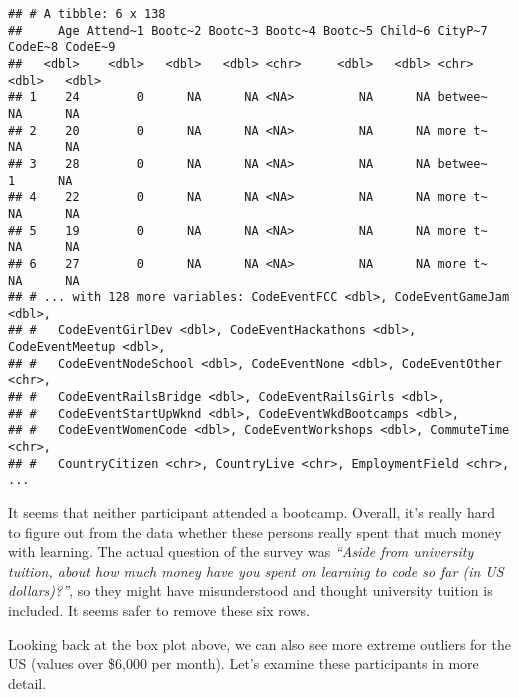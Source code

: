 \documentclass[
]{article}
\newenvironment{Shaded}{\begin{snugshade}}{\end{snugshade}}
\newcommand{\CommentTok}[1]{\textcolor[rgb]{0.56,0.35,0.01}{\textit{#1}}}
\newcommand{\FunctionTok}[1]{\textcolor[rgb]{0.00,0.00,0.00}{#1}}
\newcommand{\NormalTok}[1]{#1}
\newcommand{\OtherTok}[1]{\textcolor[rgb]{0.56,0.35,0.01}{#1}}
\newcommand{\SpecialCharTok}[1]{\textcolor[rgb]{0.00,0.00,0.00}{#1}}
\begin{document}
\begin{verbatim}
## # A tibble: 6 x 138
##     Age Attend~1 Bootc~2 Bootc~3 Bootc~4 Bootc~5 Child~6 CityP~7 CodeE~8 CodeE~9
##   <dbl>    <dbl>   <dbl>   <dbl> <chr>     <dbl>   <dbl> <chr>     <dbl>   <dbl>
## 1    24        0      NA      NA <NA>         NA      NA betwee~      NA      NA
## 2    20        0      NA      NA <NA>         NA      NA more t~      NA      NA
## 3    28        0      NA      NA <NA>         NA      NA betwee~       1      NA
## 4    22        0      NA      NA <NA>         NA      NA more t~      NA      NA
## 5    19        0      NA      NA <NA>         NA      NA more t~      NA      NA
## 6    27        0      NA      NA <NA>         NA      NA more t~      NA      NA
## # ... with 128 more variables: CodeEventFCC <dbl>, CodeEventGameJam <dbl>,
## #   CodeEventGirlDev <dbl>, CodeEventHackathons <dbl>, CodeEventMeetup <dbl>,
## #   CodeEventNodeSchool <dbl>, CodeEventNone <dbl>, CodeEventOther <chr>,
## #   CodeEventRailsBridge <dbl>, CodeEventRailsGirls <dbl>,
## #   CodeEventStartUpWknd <dbl>, CodeEventWkdBootcamps <dbl>,
## #   CodeEventWomenCode <dbl>, CodeEventWorkshops <dbl>, CommuteTime <chr>,
## #   CountryCitizen <chr>, CountryLive <chr>, EmploymentField <chr>, ...
\end{verbatim}

It seems that neither participant attended a bootcamp. Overall, it's
really hard to figure out from the data whether these persons really
spent that much money with learning. The actual question of the survey
was \emph{``Aside from university tuition, about how much money have you
spent on learning to code so far (in US dollars)?''}, so they might have
misunderstood and thought university tuition is included. It seems safer
to remove these six rows.

\begin{Shaded}
\end{Shaded}

Looking back at the box plot above, we can also see more extreme
outliers for the US (values over \$6,000 per month). Let's examine these
participants in more detail.
\end{document}
